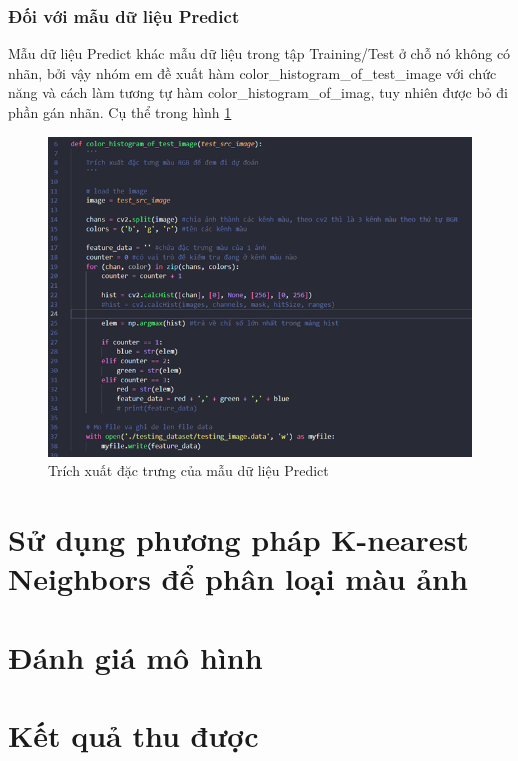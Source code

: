 \documentclass[../BTL.tex]{subfiles}
\begin{document}
\subsubsection{Đối với mẫu dữ liệu Predict}
Mẫu dữ liệu Predict khác mẫu dữ liệu trong tập Training/Test ở chỗ nó không có nhãn, bởi vậy nhóm em đề xuất hàm color\_histogram\_of\_test\_image với chức năng và cách làm tương tự hàm color\_histogram\_of\_imag, tuy nhiên được bỏ đi phần gán nhãn. Cụ thể trong hình \ref{fig:test_data}
\begin{figure}[H]
    \centering
    \includegraphics[scale=0.85]{BTL BaoCao Latex TTNT/Anh/trích xuất đặc trưng của file dự đoán.png}
    \captionsetup{justification=centering}
    \caption{Trích xuất đặc trưng của mẫu dữ liệu Predict}
    \label{fig:test_data}
\end{figure}

\section{Sử dụng phương pháp K-nearest Neighbors để phân loại màu ảnh}
\section{Đánh giá mô hình}
\section{Kết quả thu được}
\end{document}
